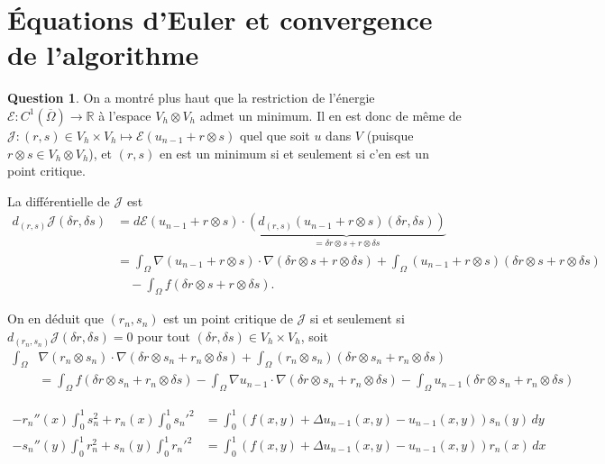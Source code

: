 \documentclass[11pt]{article}
\newcommand{\RR}{\mathbb{R}}
\theoremstyle{definition}
\newtheorem{ques}{Question}
\begin{document}
\section{Équations d'Euler et convergence de l'algorithme}

\begin{ques}
On a montré plus haut que la restriction de l'énergie $\mathcal{E}:C^1(\overline{\Omega})\longrightarrow \RR$ à l'espace $V_h\otimes V_h$ admet un minimum. Il en est donc de même de $\mathcal J:(r,s)\in V_h\times V_h\longmapsto \mathcal{E}(u_{n-1} + r\otimes s)$ quel que soit $u$ dans $V$ (puisque $r\otimes s\in V_h\otimes V_h$), et $(r,s)$ en est un minimum si et seulement si c'en est un point critique.

La différentielle de $\mathcal{J}$ est
\begin{align*}
d_{(r,s)}\mathcal J(\delta r,\delta s) 
&= d\mathcal{E}(u_{n-1}+r\otimes s)\cdot
\underbrace{\left(
d_{(r,s)}(u_{n-1}+r\otimes s)(\delta r,\delta s)\right)
}_{= \delta r\otimes s + r\otimes\delta s} \\
&= \int_\Omega \nabla(u_{n-1}+r\otimes s)\cdot\nabla(\delta r\otimes s + r\otimes\delta s)
+ \int_\Omega (u_{n-1}+r\otimes s)(\delta r\otimes s + r\otimes\delta s)
\\ &\quad - \int_\Omega f(\delta r\otimes s + r\otimes\delta s).
\end{align*}

On en déduit que $(r_n,s_n)$ est un point critique de $\mathcal{J}$ si et seulement si $d_{(r_n,s_n)}\mathcal{J}(\delta r,\delta s) = 0$ pour tout $(\delta r,\delta s)\in V_h\times V_h$, soit
\begin{align}
\int_\Omega &\nabla(r_n\otimes s_n)\cdot\nabla(\delta r\otimes s_n + r_n\otimes \delta s) + \int_\Omega (r_n\otimes s_n)(\delta r\otimes s_n + r_n\otimes \delta s) \nonumber \\
&=\int_\Omega f(\delta r\otimes s_n + r_n\otimes\delta s) - \int_\Omega \nabla u_{n-1}\cdot\nabla(\delta r\otimes s_n + r_n\otimes\delta s) - \int_\Omega u_{n-1}(\delta r\otimes s_n + r_n\otimes\delta s)
\end{align}

\begin{align*}
-r_n''(x)\int_0^1 s_n^2 + r_n(x)\int_{0}^{1}{s_n'}^2 &= \int_{0}^{1}(f(x,y)+\Delta u_{n-1}(x,y) - u_{n-1}(x,y))s_n(y)\,dy \\
-s_n''(y)\int_0^1 r_n^2 + s_n(y)\int_{0}^{1}{r_n'}^2 &= \int_{0}^{1}(f(x,y)+\Delta u_{n-1}(x,y) - u_{n-1}(x,y))r_n(x)\,dx
\end{align*}


\end{ques}
\end{document}
